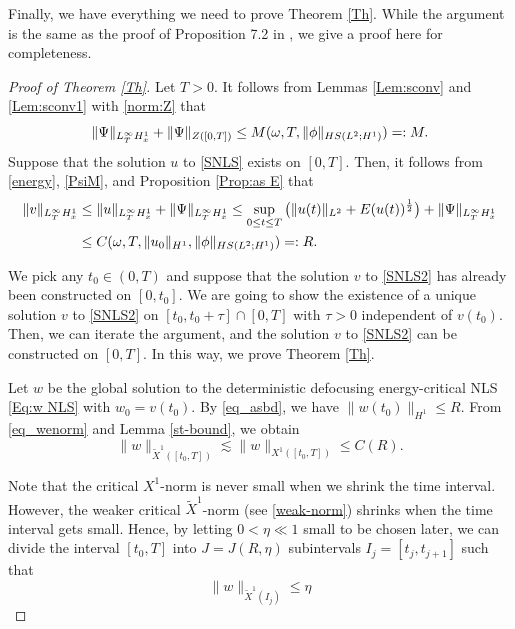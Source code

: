 \documentclass[letterpaper, 11pt,  reqno]{amsart}
\newcommand{\1}{\hspace{0.5mm}\text{I}\hspace{0.5mm}}
\newcommand{\noi}{\noindent}
\newcommand{\wt}{\widetilde}
\newcommand{\HS}{\textup{HS}}
\renewcommand{\o}{\omega}
\newcommand{\les}{\lesssim}
\numberwithin{equation}{section}
\numberwithin{theorem}{section}
\begin{document}
Finally, we have everything we need to
prove Theorem \ref{Th}.
While the argument is the same as the proof of Proposition 7.2 in \cite{BOP15},
we give a proof here for completeness.



\begin{proof}[Proof of Theorem \ref{Th}]
Let $T>0$.
It follows from Lemmas \ref{Lem:sconv} and \ref{Lem:sconv1} with \eqref{norm:Z} that
\begin{equation}
\|\Psi\|_{L^\infty_T H^1_x}
+ \|\Psi\|_{Z([0,T])}
\le 
M(\o, T, \|\phi\|_{\HS(L^2;H^1)}) =:M.
\label{PsiM}
\end{equation}
Suppose that the solution $u$ to \eqref{SNLS} exists on $[0,T]$.
Then,
it follows from \eqref{energy},
\eqref{PsiM},
and Proposition \ref{Prop:as E}
that
\begin{align}
\label{eq_asbd}
\begin{aligned}
\|v\|_{L^\infty_T H^1_x }
&\le  \|u\|_{L^\infty_T H^1_x } + \|\Psi\|_{L^\infty_T H^1_x }
\le \sup_{0\le t\le T}
\big( \| u(t) \|_{L^2} + E(u(t))^\frac12 \big) + \|\Psi\|_{L^\infty_T H^1_x }\\
&\leq C(\omega, T, \| u_0 \|_{H^1}, \|\phi\|_{\HS(L^2;H^1)})
=:R .
\end{aligned}
\end{align}


We pick any $t_0\in (0,T)$ 
and suppose that the solution $v$ to \eqref{SNLS2} 
has already been constructed on $[0,t_0]$. 
We are going to show 
the existence of a unique solution $v$ 
to \eqref{SNLS2} on $[t_0,t_0+\tau]\cap[0,T]$ with $\tau>0$ independent of $v(t_0)$. 
Then, we can iterate the argument, and the
solution $v$ to \eqref{SNLS2} 
can be constructed on $[0,T]$. 
In this way, 
we prove Theorem \ref{Th}.



Let $w$ be the global solution to
the deterministic defocusing energy-critical NLS \eqref{Eq:w NLS}
with $w_0=v(t_0)$. 
By \eqref{eq_asbd}, we have $\| w(t_0)\|_{H^1}\leq R$.
From \eqref{eq_wenorm} and Lemma \ref{st-bound}, 
we obtain
\begin{equation}
    \|w\|_{\wt X^1([t_0,T])}\les
    \|w\|_{X^1([t_0,T])}\leq C(R).
\label{bdWI1}
\end{equation}



\noi
Note that the critical $X^1$-norm is never small when we shrink the time interval.
However, the weaker critical $\wt X^1$-norm (see \eqref{weak-norm})
shrinks when the time interval gets small.
Hence,
by letting $0<\eta\ll 1$ small to be chosen later,
we can divide the interval 
$[t_0,T]$ into $J=J(R,\eta)$ subintervals $I_j=[t_j,t_{j+1}]$
such that
\begin{equation}
\|w\|_{\wt X^1(I_j)}
\le \eta
\label{bdwI}
\end{equation}




\end{proof}
\end{document}
